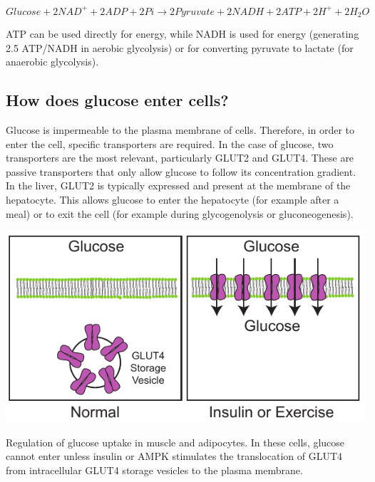 \documentclass{tufte-handout}
\begin{document}
\begin{equation}\label{eq:overall}
Glucose + 2NAD^+ + 2ADP + 2Pi \rightarrow 2Pyruvate + 2NADH + 2ATP + 2H^+ +2H_2O
\end{equation}

ATP can be used directly for energy, while NADH is used for energy (generating 2.5 ATP/NADH in aerobic glycolysis) or for converting pyruvate to lactate (for anaerobic glycolysis).

\subsection{How does glucose enter cells?}

Glucose is impermeable to the plasma membrane of cells.  Therefore, in order to enter the cell, specific transporters are required.  In the case of glucose, two transporters are the most relevant, particularly GLUT2 and GLUT4.  These are passive transporters that only allow glucose to follow its concentration gradient.  In the liver, GLUT2 is typically expressed and present at the membrane of the hepatocyte.  This allows glucose to enter the hepatocyte (for example after a meal) or to exit the cell (for example during glycogenolysis or gluconeogenesis).

\begin{marginfigure}
\includegraphics{figures/GLUT4-Trafficking.pdf}
\caption{Regulation of glucose uptake in muscle and adipocytes.  In these cells, glucose cannot enter unless insulin or AMPK stimulates the translocation of GLUT4 from intracellular GLUT4 storage vesicles to the plasma membrane.}
\label{fig:GLUT4-Trafficking}
\end{marginfigure}
\end{document}

